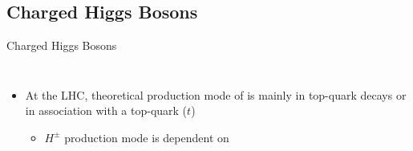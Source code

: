 \documentclass[aspectratio=169,xcolor=table]{beamer}
\begin{document}
  \subsection{Charged Higgs Bosons }

    \begin{frame}[t]{Charged Higgs Bosons}
      \begin{columns}
      \begin{itemize}
        \item At the LHC, theoretical production mode of \mHpm is mainly in top-quark decays or in association with a top-quark ($t$)
        \begin{itemize}
          \item $H^{\pm}$ production mode is dependent on \mHpm
        \end{itemize}
        \begin{columns}
            \begin{figure}
              \tiny

\end{figure}
\end{columns}
\end{itemize}
\end{columns}
\end{frame}
\end{document}
